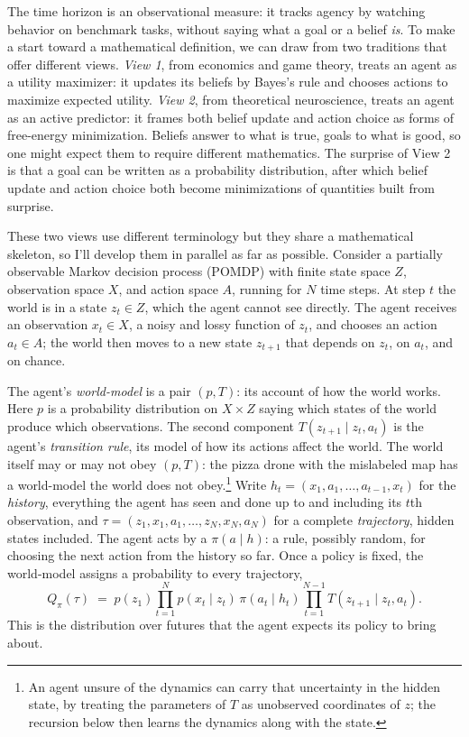 The time horizon is an observational measure: it tracks agency by watching behavior on benchmark tasks, without saying what a goal or a belief \emph{is}. To make a start toward a mathematical definition, we can draw from two traditions that offer different views. \emph{View 1}, from economics and game theory, treats an agent as a utility maximizer: it updates its beliefs by Bayes's rule and chooses actions to maximize expected utility. \emph{View 2}, from theoretical neuroscience, treats an agent as an active predictor: it frames both belief update and action choice as forms of free-energy minimization. Beliefs answer to what is true, goals to what is good, so one might expect them to require different mathematics. The surprise of View 2 is that a goal can be written as a probability distribution, after which belief update and action choice both become minimizations of quantities built from surprise.

These two views use different terminology but they share a mathematical skeleton, so I'll develop them in parallel as far as possible. Consider a partially observable Markov decision process (POMDP) with finite state space $Z$, observation space $X$, and action space $A$, running for $N$ time steps. At step $t$ the world is in a state $z_t\in Z$, which the agent cannot see directly. The agent receives an observation $x_t\in X$, a noisy and lossy function of $z_t$, and chooses an action $a_t\in A$; the world then moves to a new state $z_{t+1}$ that depends on $z_t$, on $a_t$, and on chance.

The agent's \emph{world-model} is a pair $(p,T)$: its account of how the world works. Here $p$ is a probability distribution on $X\times Z$ saying which states of the world produce which observations. The second component $T(z_{t+1}\mid z_t,a_t)$ is the agent's \emph{transition rule}, its model of how its actions affect the world. The world itself may or may not obey $(p,T)$: the pizza drone with the mislabeled map has a world-model the world does not obey.\footnote{An agent unsure of the dynamics can carry that uncertainty in the hidden state, by treating the parameters of $T$ as unobserved coordinates of $z$; the recursion below then learns the dynamics along with the state.} Write $h_t=(x_1,a_1,\ldots,a_{t-1},x_t)$ for the \emph{history}, everything the agent has seen and done up to and including its $t$th observation, and $\tau=(z_1,x_1,a_1,\ldots,z_N,x_N,a_N)$ for a complete \emph{trajectory}, hidden states included. The agent acts by a  $\pi(a\mid h)$: a rule, possibly random, for choosing the next action from the history so far. Once a policy is fixed, the world-model assigns a probability to every trajectory,
\[
   Q_\pi(\tau)\;=\;p(z_1)\prod_{t=1}^{N} p(x_t\mid z_t)\,\pi(a_t\mid h_t)\prod_{t=1}^{N-1} T(z_{t+1}\mid z_t,a_t).
\]
This is the distribution over futures that the agent expects its policy to bring about.

